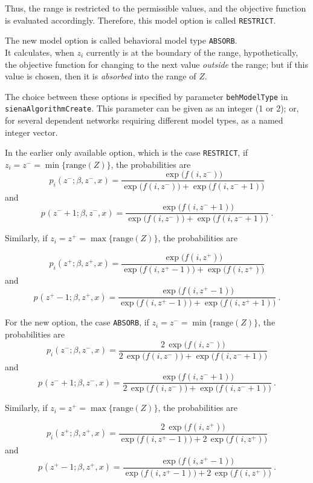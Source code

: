 \documentclass[a4paper,12pt,fleqn]{article}
\begin{document}
Thus, the range is restricted to the permissible values,
and the objective function is evaluated accordingly.
Therefore, this model option is called \texttt{RESTRICT}.

The new model option is called behavioral model type \texttt{ABSORB}.\\
It calculates, when $z_i$ currently is at the boundary of the range,
hypothetically, the objective function for
changing to the next value \emph{outside} the range;
but if this value is chosen, then it is \emph{absorbed}
into the range of $Z$.

The choice between these options
is specified by parameter \texttt{behModelType} in
\texttt{sienaAlgorithmCreate}.
This parameter can be given as an integer (1 or 2);
or, for several dependent networks requiring different model types,
as a named integer vector.

In the earlier only available option, which is the case \texttt{RESTRICT},
if \\$z_i = z^- = \min\{\text{range}(Z)\}$,
the probabilities are
\[
p_{i}(z^- ; \beta, z^-, x) = \frac{\exp\big(f(i,z^- )\big)}
             { \exp\big(f(i,z^- )\big) + \exp\big(f(i,z^- + 1)\big)}
\]
and
\[
p_{}(z^- + 1; \beta, z^-, x) = \frac{\exp\big(f(i,z^- + 1)\big) }
             {\exp\big(f(i,z^- )\big) + \exp\big(f(i,z^- + 1)\big)} \ .
\]

Similarly, if $z_i = z^+ = \max\{\text{range}(Z)\}$, the probabilities are

\[
p_{i}(z^+ ; \beta, z^+, x) = \frac{\exp\big(f(i,z^+ )\big)  }
             {\exp\big(f(i,z^+ - 1)\big) + \exp\big(f(i,z^+ )\big) }
\]
and
\[
p_{}(z^+ - 1; \beta, z^+, x) = \frac{\exp\big(f(i,z^+ - 1)\big) }
             {\exp\big(f(i,z^+ - 1)\big) + \exp\big(f(i,z^+ + 1)\big)} \ .
\]

For the new option, the case \texttt{ABSORB},
if $z_i = z^- = \min\{\text{range}(Z)\}$,
the probabilities are
\[
p_{i}(z^- ; \beta, z^-, x) = \frac{2\, \exp\big(f(i,z^- )\big)}
             {2\, \exp\big(f(i,z^- )\big) + \exp\big(f(i,z^- + 1)\big)}
\]
and
\[
p_{}(z^- + 1; \beta, z^-, x) = \frac{\exp\big(f(i,z^- + 1)\big) }
             {2\, \exp\big(f(i,z^- )\big) + \exp\big(f(i,z^- + 1)\big)} \ .
\]

Similarly, if $z_i = z^+ = \max\{\text{range}(Z)\}$, the probabilities are

\[
p_{i}(z^+ ; \beta, z^+, x) = \frac{2\,\exp\big(f(i,z^+ )\big) }
             {\exp\big(f(i,z^+ - 1)\big)
             + 2\,\exp\big(f(i,z^+ )\big) }
\]
and
\[
p_{}(z^+ - 1; \beta, z^+, x) = \frac{\exp\big(f(i,z^+ - 1)\big) }
             {\exp\big(f(i,z^+ - 1)\big)
             + 2\,\exp\big(f(i,z^+ )\big) } \ .
\]
\end{document}
